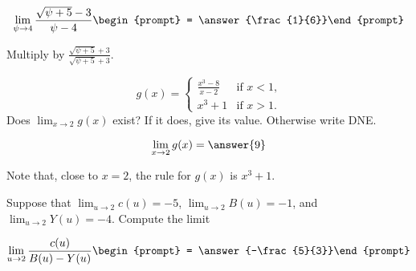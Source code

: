 \documentclass[handout]{ximera}
\begin{document}

\begin{exercise}
\[
\lim_{\psi\to 4 } \frac{\sqrt{\psi +5}-3}{\psi -4}\begin{prompt} = \answer{\frac{1}{6}}\end{prompt}
\]
\begin{hint}
Multiply by $\frac{\sqrt{\psi +5}+3}{\sqrt{\psi +5}+3}$.
\end{hint}
\end{exercise}

\begin{exercise}
\[
g(x) = \begin{cases}
  \frac{x^3 - 8}{x-2}  &\text{if $x<1$,} \\
  x^3+1 &\text{if  $x>1$.}
\end{cases}
\]
Does $\lim_{x \to 2} g(x)$ exist?  If it does, give its value.
Otherwise write DNE.

\[
\lim_{x \to 2} g(x) = \answer{9}
\]

\begin{hint}
	Note that, close to $x=2$, the rule for $g(x)$ is $x^3+1$.
\end{hint}

\end{exercise}

\begin{exercise}
Suppose that $\displaystyle\lim_{u\to2}c(u)=-5$, $\displaystyle\lim_{u\to2}B(u)=-1$, and $\displaystyle\lim_{u\to2}Y(u)=-4$. Compute the limit

\[
\lim_{u\to 2 } \frac{c(u)}{B(u)-Y(u)}\begin{prompt} = \answer{-\frac{5}{3}}\end{prompt}
\]
\end{exercise}
\end{document}
